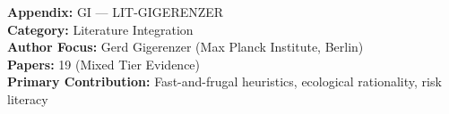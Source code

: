 %
%

%
%
%
%
%

\begin{tcolorbox}[colback=gray!5!white, colframe=gray!75!black,
    title=Appendix Metadata]
\textbf{Appendix:} GI --- LIT-GIGERENZER \\
\textbf{Category:} Literature Integration \\
\textbf{Author Focus:} Gerd Gigerenzer (Max Planck Institute, Berlin) \\
\textbf{Papers:} 19 (Mixed Tier Evidence) \\
\textbf{Primary Contribution:} Fast-and-frugal heuristics, ecological rationality, risk literacy
\end{tcolorbox}


